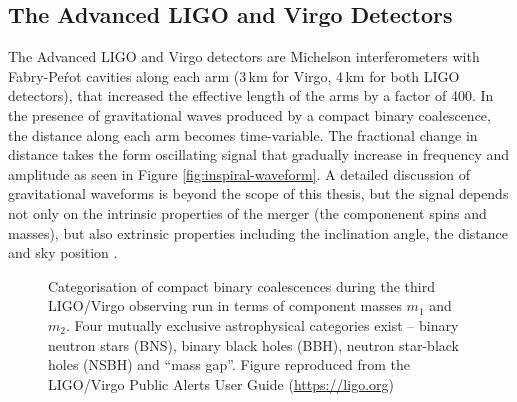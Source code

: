 \subsection{The Advanced LIGO and Virgo Detectors}


The Advanced LIGO and Virgo detectors \citep{2015CQGra..32g4001L,2015CQGra..32b4001A} are Michelson interferometers \citep{1887AmJS...34..333M} with Fabry-Pe\'rot cavities along each arm (3\,km for Virgo, 4\,km for both LIGO detectors), that increased the effective length of the arms by a factor of 400. In the presence of gravitational waves produced by a compact binary coalescence, the distance along each arm becomes time-variable. The fractional change in distance takes the form oscillating signal that gradually increase in frequency and amplitude as seen in Figure \ref{fig:inspiral-waveform}. A detailed discussion of gravitational waveforms is beyond the scope of this thesis, but the signal depends not only on the intrinsic properties of the merger (the componenent spins and masses), but also extrinsic properties including the inclination angle, the distance and sky position \citep{1993PhRvD..47.2198F}.

\begin{figure}
    \centering
    
    \caption[Categorisation of gravitational wave events by mass]{Categorisation of compact binary coalescences during the third LIGO/Virgo observing run in terms of component masses $m_1$ and $m_2$. Four mutually exclusive astrophysical categories exist -- binary neutron stars (BNS), binary black holes (BBH), neutron star-black holes (NSBH) and ``mass gap''. Figure reproduced from the LIGO/Virgo Public Alerts User Guide (\url{https://ligo.org})}
    \label{fig:mass-gap-diagram}
\end{figure}

